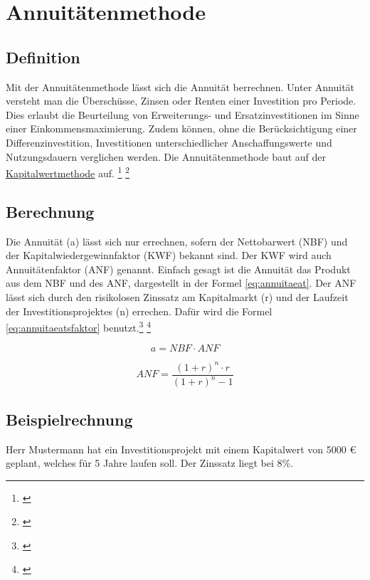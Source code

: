\chapter{Annuitätenmethode}
\label{Annuitaetenmethode}

\section{Definition}

Mit der Annuitätenmethode lässt sich die Annuität berrechnen. Unter Annuität versteht man die Überschüsse, Zinsen oder Renten einer Investition pro Periode. Dies erlaubt die Beurteilung von Erweiterungs- und Ersatzinvestitionen im Sinne einer Einkommensmaximierung. Zudem können, ohne die Berücksichtigung einer Differenzinvestition, Investitionen unterschiedlicher Anschaffungswerte und Nutzungsdauern verglichen werden. Die Annuitätenmethode baut auf der \hyperref[Kapitalwertmethode]{Kapitalwertmethode} auf. \footnote{\cite{bwllexicon-annu}} \footnote{\cite{wikipedia-annu}}

\section{Berechnung}

Die Annuität (a) lässt sich nur errechnen, sofern der Nettobarwert (NBF) und der Kapitalwiedergewinnfaktor (KWF) bekannt sind. Der KWF wird auch Annuitätenfaktor (ANF) genannt. Einfach gesagt ist die Annuität das Produkt aus dem NBF und des ANF, dargestellt in der Formel \eqref{eq:annuitaeat}. Der ANF lässt sich durch den risikolosen Zinssatz am Kapitalmarkt (r) und der Laufzeit der Investitionsprojektes (n) errechen. Dafür wird die Formel \eqref{eq:annuitaeatsfaktor} benutzt.\footnote{\cite{studyflix-annu}} \footnote{\cite{bwllexicon-annu}}

\begin{equation}
    a = NBF \cdot ANF
    \label{eq:annuitaeat}
\end{equation}

\begin{equation}
    ANF = \frac{ (1 + r)^n \cdot r }{ (1 + r)^n - 1 }
    \label{eq:annuitaeatsfaktor}
\end{equation}

\section{Beispielrechnung}

Herr Mustermann hat ein Investitionsprojekt mit einem Kapitalwert von 5000 € geplant, welches für 5 Jahre laufen soll. Der Zinssatz liegt bei 8\%.


